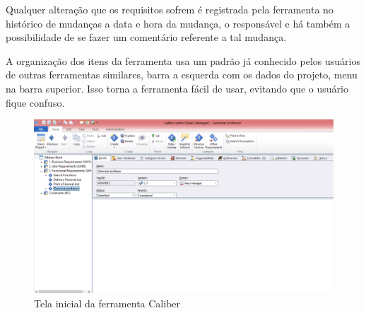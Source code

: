 Qualquer alteração que os requisitos sofrem é registrada pela ferramenta no histórico de mudanças a data e hora da mudança, o responsável e há também a possibilidade de se fazer um comentário referente a tal mudança.

A organização dos itens da ferramenta usa um padrão já conhecido pelos usuários de outras ferramentas similares, barra a esquerda com os dados do projeto, menu na barra superior. Isso torna a ferramenta fácil de usar, evitando que o usuário fique confuso.
\begin{figure}[!htb]
\centering
\includegraphics[scale=0.4]{figuras/caliber.png}
\caption{Tela inicial da ferramenta Caliber}
\end{figure}
